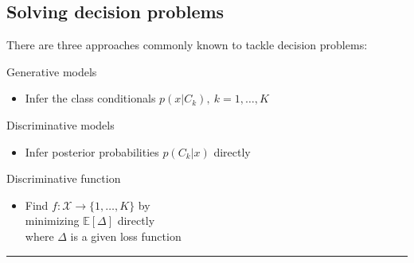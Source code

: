\subsection{Solving decision problems}
There are three approaches commonly known to tackle decision problems: %
\\[.5cm]%
\begin{minipage}{1\textwidth}
	\begin{minipage}[t]{.32\textwidth}
		\centerline{\Large{}Generative models}
		\vspace*{5pt}
		\begin{itemize}
			\item Infer the class conditionals $p(x|C_k),~k=1,\ldots,K$
		\end{itemize}
	\end{minipage}
	\hfill\vrule\hfill
	\begin{minipage}[t]{.32\textwidth}
		\centerline{\Large{}Discriminative models}
		\vspace*{5pt}
		\begin{itemize}
			\item Infer posterior probabilities $p(C_k|x)$ directly
		\end{itemize}
	\end{minipage}
	\hfill\vrule\hfill
	\begin{minipage}[t]{.32\textwidth}
		\centerline{\Large{}Discriminative function}
		\vspace*{5pt}
		\begin{itemize}
			\item Find $f:\mathcal{X}\rightarrow\{1,\ldots,K\}$ by\\minimizing $\mathbb{E}\left[\Delta\right]$ directly\\where $\Delta$ is a given loss function\\
		\end{itemize}
	\end{minipage}
\end{minipage}
\hrule height 1pt%
~\\%
